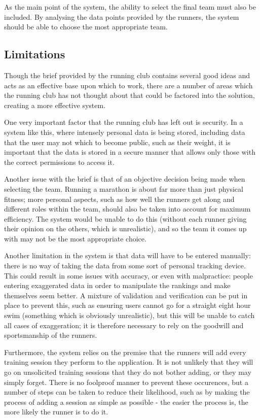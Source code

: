 \documentclass{article}[12pt,a4paper]
\begin{document}
As the main point of the system, the ability to select the final team must also be included. By analysing the data points provided by the runners, the system should be able to choose the most appropriate team.

\subsection{Limitations}
Though the brief provided by the running club contains several good ideas and acts as an effective base upon which to work, there are a number of areas which the running club has not thought about that could be factored into the solution, creating a more effective system. 

One very important factor that the running club has left out is security. In a system like this, where intensely personal data is being stored, including data that the user may not which to become public, such as their weight, it is important that the data is stored in a secure manner that allows only those with the correct permissions to access it. 

Another issue with the brief is that of an objective decision being made when selecting the team. Running a marathon is about far more than just physical fitness; more personal aspects, such as how well the runners get along and different roles within the team, should also be taken into account for maximum efficiency. The system would be unable to do this (without each runner giving their opinion on the others, which is unrealistic), and so the team it comes up with may not be the most appropriate choice. 

Another limitation in the system is that data will have to be entered manually: there is no way of taking the data from some sort of personal tracking device. This could result in some issues with accuracy, or even with malpractice: people entering exaggerated data in order to manipulate the rankings and make themselves seem better. A mixture of validation and verification can be put in place to prevent this, such as ensuring users cannot go for a straight eight hour swim (something which is obviously unrealistic), but this will be unable to catch all cases of exaggeration; it is therefore necessary to rely on the goodwill and sportsmanship of the runners.

Furthermore, the system relies on the premise that the runners will add every training session they perform to the application. It is not unlikely that they will go on unsolicited training sessions that they do not bother adding, or they may simply forget. There is no foolproof manner to prevent these occurences, but a number of steps can be taken to reduce their likelihood, such as by making the process of adding a session as simple as possible - the easier the process is, the more likely the runner is to do it.
\end{document}
